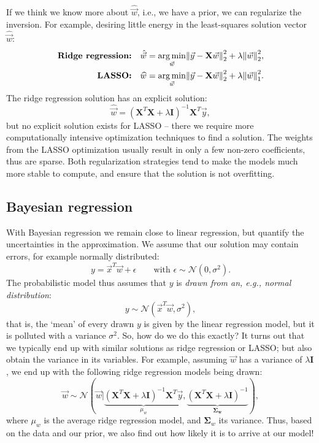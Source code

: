 \documentclass{article}
\DeclarePairedDelimiter\norm{\lVert}{\rVert}%
\DeclareMathOperator*{\argmin}{arg\,min}
\begin{document}
\begin{spexample}
    If we think we know more about $\hat{\vec{w}}$, i.e., we have a prior, we can regularize the inversion. For example, desiring little energy in the least-squares solution vector $\hat{\vec{w}}$:
    \begin{align}
        \textbf{Ridge regression:}\quad&\hat{\vec{w}} = \argmin_{\vec{w}} \norm*{\vec{y}-\mathbf{X}\vec{w}}_2^2 + \lambda\norm*{\vec{w}}_2^2,\\
        \textbf{LASSO:}\quad&\widehat{w} = \argmin_{\vec{w}} \norm*{\vec{y}-\mathbf{X}\vec{w}}_2^2 + \lambda\norm*{\vec{w}}_1^2.
    \end{align}
    The ridge regression solution has an explicit solution:
    \begin{equation}
        \hat{\vec{w}} = (\mathbf{X}^T\mathbf{X}+\lambda\mathbf{I})^{-1}\mathbf{X}^T\vec{y},
    \end{equation}
    but no explicit solution exists for LASSO -- there we require more computationally intensive optimization techniques to find a solution. The weights from the LASSO optimization usually result in only a few non-zero coefficients, thus are sparse. Both regularization strategies tend to make the models much more stable to compute, and ensure that the solution is not overfitting.
\end{spexample}

\subsection{Bayesian regression}
With Bayesian regression we remain close to linear regression, but quantify the uncertainties in the approximation. We assume that our solution may contain errors, for example normally distributed:
\begin{equation}
    y = \vec{x}^T\vec{w} + \epsilon\quad\quad\text{with }\epsilon \sim \mathcal{N}(0,\sigma^2).
\end{equation}
The probabilistic model thus assumes that $y$ is \textit{drawn from an, e.g., normal distribution}:
\begin{equation}
    y \sim \mathcal{N}(\vec{x}^T\vec{w},\sigma^2),\label{eq:drawingy}
\end{equation}
that is, the `mean' of every drawn $y$ is given by the linear regression model, but it is polluted with a variance $\sigma^2$. So, how do we do this exactly? It turns out that we typically end up with similar solutions as ridge regression or LASSO; but also obtain the variance in its variables. For example, assuming $\vec{w}$ has a variance of $\lambda\mathbf{I}$, we end up with the following ridge regression models being drawn:
\begin{equation}
    \vec{w} \sim \mathcal{N}(\vec{w}|\underbrace{(\mathbf{X}^T\mathbf{X}+\lambda\mathbf{I})^{-1}\mathbf{X}^T\vec{y}}_{\mu_w},\underbrace{(\mathbf{X}^T\mathbf{X}+\lambda\mathbf{I})^{-1}}_{\bm{\Sigma_w}}),
\end{equation}
where $\mu_w$ is the average ridge regression model, and $\bm{\Sigma}_w$ its variance. Thus, based on the data and our prior, we also find out how likely it is to arrive at our model!
\end{document}

